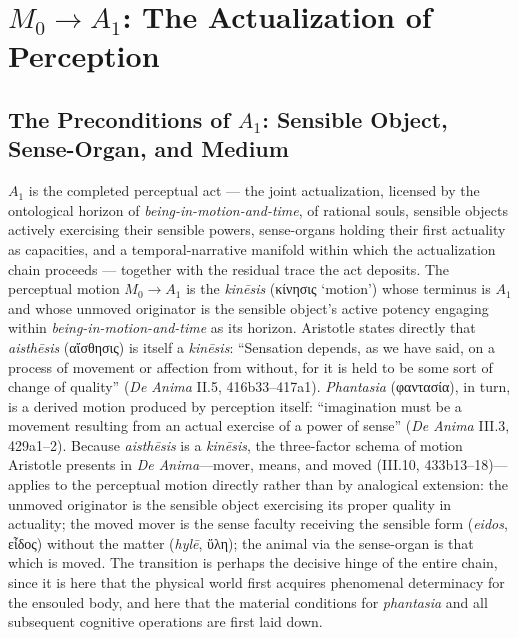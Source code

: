 \documentclass{article}
\newcommand{\gk}[1]{{\greekfont #1}}
\begin{document}
\section{$M_0 \rightarrow A_1$: The Actualization of Perception}

\subsection{The Preconditions of $A_1$: Sensible Object, Sense-Organ, and Medium}

$A_1$ is the completed perceptual act --- the joint actualization, licensed by the ontological horizon of \textit{being-in-motion-and-time}, of rational souls, sensible objects actively exercising their sensible powers, sense-organs holding their first actuality as capacities, and a temporal-narrative manifold within which the actualization chain proceeds --- together with the residual trace the act deposits. The perceptual motion $M_0 \rightarrow A_1$ is the \textit{kinēsis} (\gk{κίνησις} `motion') whose terminus is $A_1$ and whose unmoved originator is the sensible object's active potency engaging within \textit{being-in-motion-and-time} as its horizon. Aristotle states directly that \textit{aisthēsis} (\gk{αἴσθησις}) is itself a \textit{kinēsis}: ``Sensation depends, as we have said, on a process of movement or affection from without, for it is held to be some sort of change of quality'' (\textit{De Anima} II.5, 416b33--417a1). \textit{Phantasia} (\gk{φαντασία}), in turn, is a derived motion produced by perception itself: ``imagination must be a movement resulting from an actual exercise of a power of sense'' (\textit{De Anima} III.3, 429a1--2). Because \textit{aisthēsis} is a \textit{kinēsis}, the three-factor schema of motion Aristotle presents in \textit{De Anima}---mover, means, and moved (III.10, 433b13--18)---applies to the perceptual motion directly rather than by analogical extension: the unmoved originator is the sensible object exercising its proper quality in actuality; the moved mover is the sense faculty receiving the sensible form (\textit{eidos}, \gk{εἶδος}) without the matter (\textit{hylē}, \gk{ὕλη}); the animal via the sense-organ is that which is moved. The transition is perhaps the decisive hinge of the entire chain, since it is here that the physical world first acquires phenomenal determinacy for the ensouled body, and here that the material conditions for \textit{phantasia} and all subsequent cognitive operations are first laid down.
\end{document}

